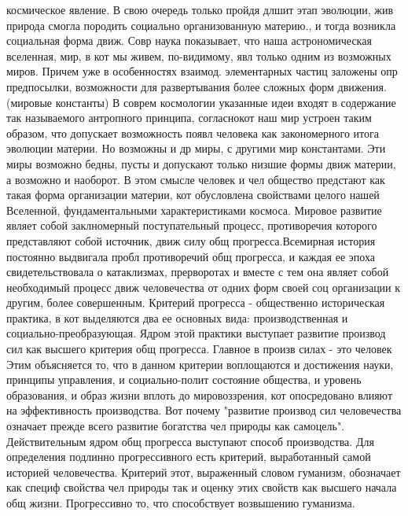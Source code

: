 \documentclass[12pt]{article}
\begin{document}
космическое явление. В свою очередь только пройдя длшит этап эволюции, жив природа смогла породить
социально организованную материю., и тогда возникла социальная форма движ.
Совр наука показывает, что наша астрономическая вселенная, мир, в кот мы живем, по-видимому, явл только
одним  из  возможных  миров.  Причем  уже  в  особенностях  взаимод.  элементарных  частиц  заложены  опр
предпосылки, возможности для развертывания более сложных форм движения. (мировые константы)
В соврем космологии указанные идеи входят в содержание так называемого антропного принципа, согласнокот
наш мир устроен таким образом, что допускает возможность появл человека как закономерного итога эволюции
материи. Но возможны и др миры, с другими мир константами. Эти миры возможно бедны, пусты и допускают
только низшие формы движ материи, а возможно и наоборот. В этом смысле человек и чел общество предстают
как  такая  форма  организации  материи,  кот  обусловлена  свойствами  целого  нашей  Вселенной,
фундаментальными характеристиками космоса. 
Мировое развитие являет собой заклномерный поступательный процесс, противоречия которого представляют
собой источник, движ силу общ прогресса.Всемирная история постоянно выдвигала пробл противоречий общ
прогресса, и каждая ее эпоха свидетельствовала о катаклизмах, прерворотах и вместе с тем она являет собой
необходимый процесс движ человечества от одних форм своей соц организации к другим, более совершенным. 
Критерий  прогресса  -  общественно  историческая  практика,  в  кот  выделяются  два  ее  основных  вида:
производственная и социально-преобразующая. Ядром этой практики выступает развитие производ сил как
высшего критерия общ прогресса. Главное в произв силах - это человек Этим объясняется то, что в данном
критерии воплощаются и достижения науки, принципы управления, и социально-полит состояние общества, и
уровень образования, и образ жизни вплоть до мировоззрения, кот опосредовано влияют на эффективность
производства. Вот почему "развитие производ сил человечества означает прежде всего развитие богатства чел
природы как самоцель". Действительным ядром общ прогресса выступают способ производства.
Для  определения  подлинно  прогрессивного  есть  критерий,  выработанный  самой  историей  человечества.
Критерий этот, выраженный словом гуманизм, обозначает как специф свойства чел природы так и оценку этих
свойств как высшего начала общ жизни. Прогрессивно то, что способствует возвышению гуманизма.

\newpage
\end{document}
